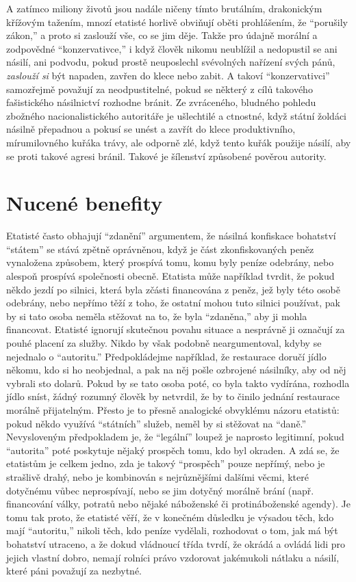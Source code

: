 \documentclass{book}
\begin{document}
A zatímco miliony životů jsou nadále ničeny tímto brutálním, drakonickým křížovým tažením, mnozí etatisté horlivě obviňují oběti prohlášením, že \enquote{porušily zákon,} a proto si zaslouží vše, co se jim děje. Takže pro údajně morální a zodpovědné \enquote{konzervativce,} i když člověk nikomu neublížil a nedopustil se ani násilí, ani podvodu, pokud prostě neuposlechl svévolných nařízení svých pánů, \emph{zaslouží si} být napaden, zavřen do klece nebo zabit. A takoví \enquote{konzervativci} samozřejmě považují za neodpustitelné, pokud se některý z cílů takového fašistického násilnictví rozhodne bránit. Ze zvráceného, bludného pohledu zbožného nacionalistického autoritáře je ušlechtilé a ctnostné, když státní žoldáci násilně přepadnou a pokusí se unést a zavřít do klece produktivního, mírumilovného kuřáka trávy, ale odporně zlé, když tento kuřák použije násilí, aby se proti takové agresi bránil. Takové je šílenství způsobené pověrou autority.

\section{Nucené benefity}

Etatisté často obhajují \enquote{zdanění} argumentem, že násilná konfiskace bohatství \enquote{státem} se stává zpětně oprávněnou, když je část zkonfiskovaných peněz vynaložena způsobem, který prospívá tomu, komu byly peníze odebrány, nebo alespoň prospívá společnosti obecně. Etatista může například tvrdit, že pokud někdo jezdí po silnici, která byla zčásti financována z peněz, jež byly této osobě odebrány, nebo nepřímo těží z toho, že ostatní mohou tuto silnici používat, pak by si tato osoba neměla stěžovat na to, že byla \enquote{zdaněna,} aby ji mohla financovat. Etatisté ignorují skutečnou povahu situace a nesprávně ji označují za pouhé placení za služby. Nikdo by však podobně neargumentoval, kdyby se nejednalo o \enquote{autoritu.} Předpokládejme například, že restaurace doručí jídlo někomu, kdo si ho neobjednal, a pak na něj pošle ozbrojené násilníky, aby od něj vybrali sto dolarů. Pokud by se tato osoba poté, co byla takto vydírána, rozhodla jídlo sníst, žádný rozumný člověk by netvrdil, že by to činilo jednání restaurace morálně přijatelným. Přesto je to přesně analogické obvyklému názoru etatistů: pokud někdo využívá \enquote{státních} služeb, neměl by si stěžovat na \enquote{daně.} Nevysloveným předpokladem je, že \enquote{legální} loupež je naprosto legitimní, pokud \enquote{autorita} poté poskytuje nějaký prospěch tomu, kdo byl okraden. A zdá se, že etatistům je celkem jedno, zda je takový \enquote{prospěch} pouze nepřímý, nebo je strašlivě drahý, nebo je kombinován s nejrůznějšími dalšími věcmi, které dotyčnému vůbec neprospívají, nebo se jim dotyčný morálně brání (např. financování války, potratů nebo nějaké náboženské či protináboženské agendy). Je tomu tak proto, že etatisté věří, že v konečném důsledku je výsadou těch, kdo mají \enquote{autoritu,} nikoli těch, kdo peníze vydělali, rozhodovat o tom, jak má být bohatství utraceno, a že dokud vládnoucí třída tvrdí, že okrádá a ovládá lidi pro jejich vlastní dobro, nemají rolníci právo vzdorovat jakémukoli nátlaku a násilí, které páni považují za nezbytné.
\end{document}
